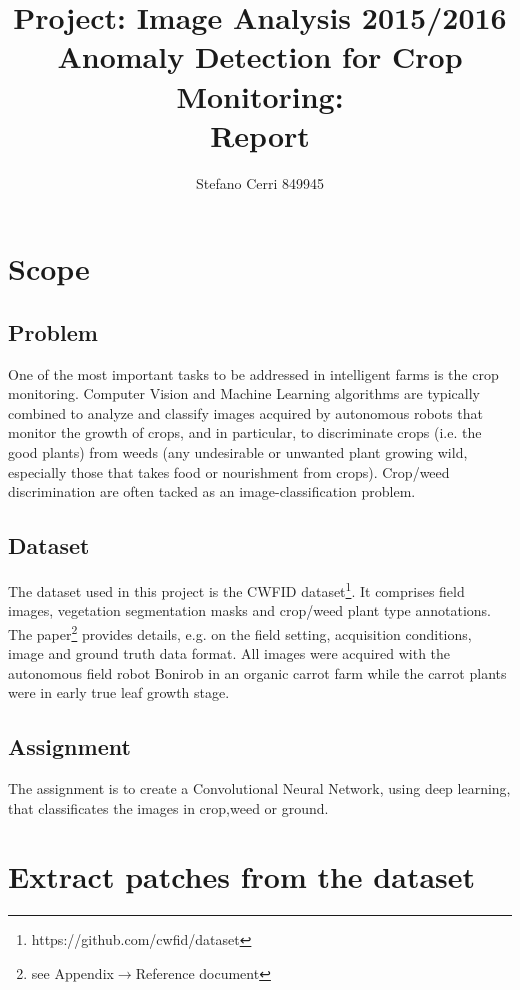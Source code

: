 \documentclass[]{report}
\title{Project: Image Analysis 2015/2016\\Anomaly Detection for Crop Monitoring:\\ Report}
\author{Stefano Cerri 849945}
\begin{document}
\maketitle
\tableofcontents
\listoffigures

\chapter{Scope}

\section{Problem}

One of the most important tasks to be addressed in intelligent farms is the crop monitoring. Computer Vision and Machine Learning algorithms are typically combined to analyze and classify images acquired by autonomous robots that monitor the growth of crops, and in particular, to discriminate crops (i.e. the good plants) from weeds (any undesirable or unwanted plant growing wild, especially those that takes food or nourishment from crops). Crop/weed discrimination are often tacked as an image-classification problem.


\section{Dataset}

The dataset used in this project is the CWFID dataset\footnote{https://github.com/cwfid/dataset}. It comprises field images, vegetation segmentation masks and crop/weed plant type annotations. The paper\footnote{see Appendix$\rightarrow  $Reference document} provides details, e.g. on the field setting, acquisition conditions, image and ground truth data format.
All images were acquired with the autonomous field robot Bonirob in an organic carrot farm while the carrot plants were in early true leaf growth stage.

\section{Assignment}

The assignment is to create a Convolutional Neural Network, using deep learning, that classificates the images in crop,weed or ground. 

\chapter{Extract patches from the dataset}
\end{document}
